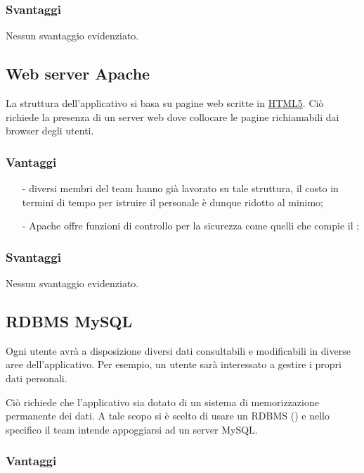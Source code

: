 \subsubsection*{Svantaggi}
Nessun svantaggio evidenziato.

 
\subsection{Web server Apache}

La struttura dell'applicativo si basa su pagine web scritte in \underline{HTML5}. Ciò richiede la presenza di un server web dove collocare le pagine richiamabili dai browser degli utenti.

\subsubsection*{Vantaggi}

\begin{itemize}[noitemsep,nolistsep]
  \item[-] diversi membri del team hanno già lavorato su tale struttura, il costo in termini di tempo per istruire il personale è dunque ridotto al minimo;
  \item[-] Apache offre funzioni di controllo per la sicurezza come quelli che compie il ;
\end{itemize}

\subsubsection*{Svantaggi}
Nessun svantaggio evidenziato.
  
\subsection{RDBMS MySQL}

Ogni utente avrà a disposizione diversi dati consultabili e modificabili in diverse aree dell'applicativo. Per esempio, un utente sarà interessato a gestire i propri dati personali.

Ciò richiede che l'applicativo sia dotato di un sistema di memorizzazione permanente dei dati. A tale scopo si è scelto di usare un RDBMS () e nello specifico  il team intende appoggiarsi ad un server MySQL\@.

\subsubsection*{Vantaggi}

